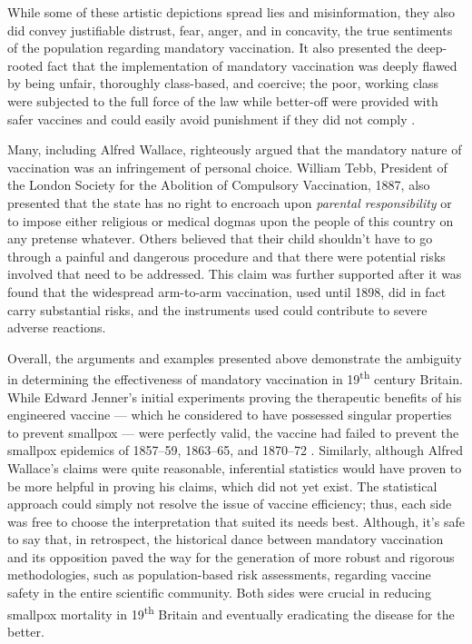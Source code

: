 \documentclass{article}
\begin{document}
While some of these artistic depictions spread lies and misinformation, they
also did convey justifiable distrust, fear, anger, and in concavity, the true
sentiments of the population regarding mandatory vaccination. It also presented
the deep-rooted fact that the implementation of mandatory vaccination was
deeply flawed by being unfair, thoroughly class-based, and coercive; the poor,
working class were subjected to the full force of the law while better-off were
provided with safer vaccines and could easily avoid punishment if they did not
comply \citep{faherty}.

Many, including Alfred Wallace, righteously argued that the mandatory nature of
vaccination was an infringement of personal
choice\citep{the_national_archives_2022}. William Tebb, President of the London
Society for the Abolition of Compulsory Vaccination, 1887, also presented that
the state has no right to encroach upon \textit{parental responsibility} or to
impose either religious or medical dogmas upon the people of this country on
any pretense whatever\citep{tebb_1887}. Others believed that their child
shouldn't have to go through a painful and dangerous procedure and that there
were potential risks involved that need to be addressed. This claim was further
supported after it was found that the widespread arm-to-arm vaccination, used
until 1898, did in fact carry substantial risks, and the instruments used could
contribute to severe adverse reactions\citep{baxby_2002}.

Overall, the arguments and examples presented above demonstrate the ambiguity
in determining the effectiveness of mandatory vaccination in
19\textsuperscript{th} century Britain. While Edward Jenner's initial
experiments proving the therapeutic benefits of his engineered vaccine ---
which he considered to have possessed singular properties to prevent smallpox
--- were perfectly valid, the vaccine had failed to prevent the smallpox
epidemics of 1857--59, 1863--65, and 1870--72 \citep{colin_r}. Similarly,
although Alfred Wallace's claims were quite reasonable, inferential statistics
would have proven to be more helpful in proving his claims, which did not yet
exist. The statistical approach could simply not resolve the issue of vaccine
efficiency; thus, each side was free to choose the interpretation that suited
its needs best. Although, it's safe to say that, in retrospect, the historical
dance between mandatory vaccination and its opposition paved the way for the
generation of more robust and rigorous methodologies, such as population-based
risk assessments, regarding vaccine safety in the entire scientific community.
Both sides were crucial in reducing smallpox mortality in
19\textsuperscript{th} Britain and eventually eradicating the disease for the
better.


\end{document}
